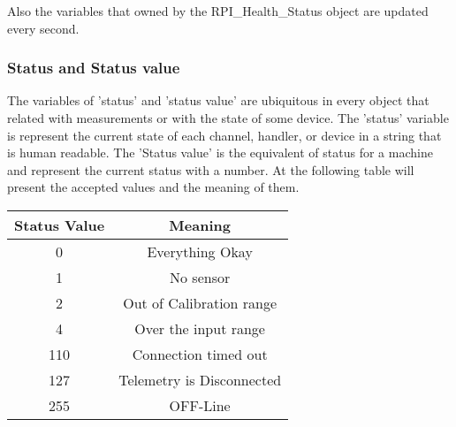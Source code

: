 Also the variables that owned by the RPI\_Health\_Status object are updated every second.

\subsubsection{Status and Status value}
 The variables of 'status' and 'status value' are ubiquitous in every object that related with measurements or with the state of some device.
 The 'status' variable is represent the current state of each channel, handler, or device in a string that is human readable. The 'Status value' is the equivalent of status for a machine
 and represent the current status with a number. At the following table will present the accepted values and the meaning of them.
 \begin{center}
 \begin{tabular}{||c | c||} 
 \hline
 Status Value & Meaning \\ [0.5ex] 
 \hline\hline
 0 & Everything Okay \\ 
 \hline
 1 & No sensor\\
 \hline
 2 & Out of Calibration range\\
 \hline
 4 & Over the input range\\
 \hline
 110 & Connection timed out\\
 \hline
 127 & Telemetry is Disconnected\\
 \hline
 255 & OFF-Line\\
 \hline
\end{tabular}
\end{center}
